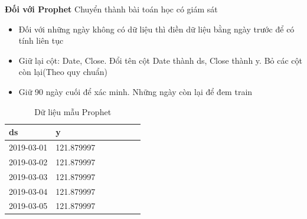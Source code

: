 \textbf{Đối với Prophet}
Chuyển thành bài toán học có giám sát
\begin{itemize}
    \item Đối với những ngày không có dữ liệu thì điền dữ liệu bằng ngày trước để có tính liên tục \\
    \item Giữ lại cột: Date, Close. Đổi tên cột Date thành ds, Close thành y. Bỏ các cột còn lại(Theo quy chuẩn) \\
    \item Giữ 90 ngày cuối để xác minh. Những ngày còn lại để đem train \\
\end{itemize}
\begin{table}[h]
	\begin{tabularx}{\textwidth}{X | X | X | X | X | X | X} 
		ds	& y	  \\ \hline
		2019-03-01	& 121.879997 \\ \hline
		2019-03-02	& 121.879997 \\ \hline
		2019-03-03	& 121.879997 \\ \hline
		2019-03-04	& 121.879997 \\ \hline
		2019-03-05	& 121.879997 \\ %
	\end{tabularx}
	\label{tab:data_prophet}
	\caption{Dữ liệu mẫu Prophet}
\end{table}
